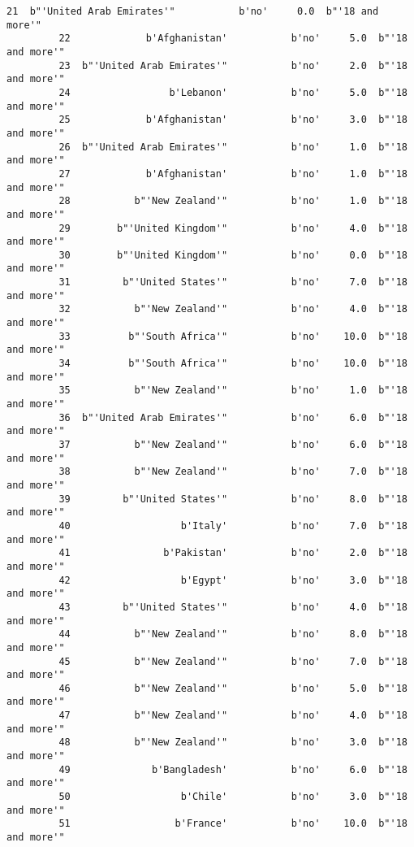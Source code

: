 \documentclass[11pt]{article}
\begin{document}
\begin{Verbatim}[commandchars=\\\{\}]
         21  b"'United Arab Emirates'"           b'no'     0.0  b"'18 and more'"   
         22             b'Afghanistan'           b'no'     5.0  b"'18 and more'"   
         23  b"'United Arab Emirates'"           b'no'     2.0  b"'18 and more'"   
         24                 b'Lebanon'           b'no'     5.0  b"'18 and more'"   
         25             b'Afghanistan'           b'no'     3.0  b"'18 and more'"   
         26  b"'United Arab Emirates'"           b'no'     1.0  b"'18 and more'"   
         27             b'Afghanistan'           b'no'     1.0  b"'18 and more'"   
         28           b"'New Zealand'"           b'no'     1.0  b"'18 and more'"   
         29        b"'United Kingdom'"           b'no'     4.0  b"'18 and more'"   
         30        b"'United Kingdom'"           b'no'     0.0  b"'18 and more'"   
         31         b"'United States'"           b'no'     7.0  b"'18 and more'"   
         32           b"'New Zealand'"           b'no'     4.0  b"'18 and more'"   
         33          b"'South Africa'"           b'no'    10.0  b"'18 and more'"   
         34          b"'South Africa'"           b'no'    10.0  b"'18 and more'"   
         35           b"'New Zealand'"           b'no'     1.0  b"'18 and more'"   
         36  b"'United Arab Emirates'"           b'no'     6.0  b"'18 and more'"   
         37           b"'New Zealand'"           b'no'     6.0  b"'18 and more'"   
         38           b"'New Zealand'"           b'no'     7.0  b"'18 and more'"   
         39         b"'United States'"           b'no'     8.0  b"'18 and more'"   
         40                   b'Italy'           b'no'     7.0  b"'18 and more'"   
         41                b'Pakistan'           b'no'     2.0  b"'18 and more'"   
         42                   b'Egypt'           b'no'     3.0  b"'18 and more'"   
         43         b"'United States'"           b'no'     4.0  b"'18 and more'"   
         44           b"'New Zealand'"           b'no'     8.0  b"'18 and more'"   
         45           b"'New Zealand'"           b'no'     7.0  b"'18 and more'"   
         46           b"'New Zealand'"           b'no'     5.0  b"'18 and more'"   
         47           b"'New Zealand'"           b'no'     4.0  b"'18 and more'"   
         48           b"'New Zealand'"           b'no'     3.0  b"'18 and more'"   
         49              b'Bangladesh'           b'no'     6.0  b"'18 and more'"   
         50                   b'Chile'           b'no'     3.0  b"'18 and more'"   
         51                  b'France'           b'no'    10.0  b"'18 and more'"   

\end{Verbatim}
\end{document}
